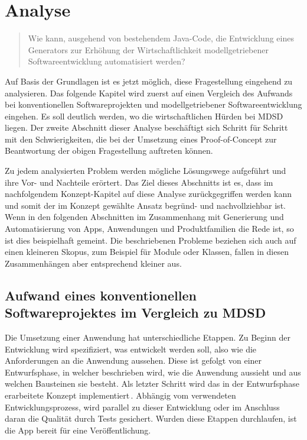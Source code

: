 \documentclass[12pt,oneside,a4paper,parskip]{scrbook}
\begin{document}
\chapter{Analyse}

\begin{quote}\glqq Wie kann, ausgehend von bestehendem Java-Code, die Entwicklung eines Generators zur Erhöhung der Wirtschaftlichkeit modellgetriebener Softwareentwicklung automatisiert werden?\grqq \end{quote}

Auf Basis der Grundlagen ist es jetzt möglich, diese Fragestellung eingehend zu analysieren. Das folgende Kapitel wird zuerst auf einen Vergleich des Aufwands bei konventionellen Softwareprojekten und modellgetriebener Softwareentwicklung eingehen. Es soll deutlich werden, wo die wirtschaftlichen Hürden bei MDSD liegen. Der zweite Abschnitt dieser Analyse beschäftigt sich Schritt für Schritt mit den Schwierigkeiten, die bei der Umsetzung eines Proof-of-Concept zur Beantwortung der obigen Fragestellung auftreten können.

Zu jedem analysierten Problem werden mögliche Lösungswege aufgeführt und ihre Vor- und Nachteile erörtert. Das Ziel dieses Abschnitts ist es, dass im nachfolgendem Konzept-Kapitel auf diese Analyse zurückgegriffen werden kann und somit der im Konzept gewählte Ansatz begründ- und nachvollziehbar ist. Wenn in den folgenden Abschnitten im Zusammenhang mit Generierung und Automatisierung von Apps, Anwendungen und Produktfamilien die Rede ist, so ist dies beispielhaft gemeint. Die beschriebenen Probleme beziehen sich auch auf einen kleineren Skopus, zum Beispiel für Module oder Klassen, fallen in diesen Zusammenhängen aber entsprechend kleiner aus.

\section{Aufwand eines konventionellen Softwareprojektes im Vergleich zu MDSD}

Die Umsetzung einer Anwendung hat unterschiedliche Etappen. Zu Beginn der Entwicklung wird spezifiziert, was entwickelt werden soll, also wie die Anforderungen an die Anwendung aussehen. Diese ist gefolgt von einer Entwurfsphase, in welcher beschrieben wird, wie die Anwendung aussieht und aus welchen Bausteinen sie besteht. Als letzter Schritt wird das in der Entwurfsphase erarbeitete Konzept implementiert\,\cite[S.\,62]{balzert2009a}. Abhängig vom verwendeten Entwicklungsprozess, wird parallel zu dieser Entwicklung oder im Anschluss daran die Qualität durch Tests gesichert. Wurden diese Etappen durchlaufen, ist die App bereit für eine Veröffentlichung.
\end{document}
